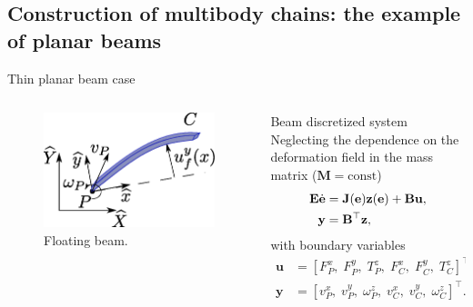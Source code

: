 \documentclass[aspectratio=169]{ISAE-Beamer}
\begin{document}
\subsection{Construction of multibody chains: the example of planar beams}

\begin{frame}{Thin planar beam case}
\begin{columns}[T]
	\begin{column}{0.5\columnwidth}
		\begin{tcolorbox}
			\begin{figure}
				\centering
				\includegraphics[width=0.98\columnwidth]{part_4/pHfmd/beam.eps} 
				\caption{Floating beam.}
				\label{fig:beam}
			\end{figure}
		\end{tcolorbox}
	\end{column}
	\begin{column}{0.5\textwidth}
		\begin{block}{Beam discretized system}
			Neglecting the dependence on the deformation field in the mass matrix ($\mathbf{M}=\text{const}$)
			\begin{equation*}
			\begin{aligned}
			\mathbf{E} \dot{\mathbf{e}} &= \mathbf{J}(\mathbf{e}) \mathbf{z}(\mathbf{e}) + \mathbf{B} \mathbf{u}, \vspace{2mm} \\
			\mathbf{y} &= \mathbf{B}^{\top}  \mathbf{z}, \\
			\end{aligned}
			\end{equation*}
			with boundary variables
			\begin{equation*}
			\begin{aligned}
			\mathbf{u} &=  [F_{P}^x, \; F_{P}^y, \; T_{P}^z, \; F_{C}^x, \; F_{C}^y, \; T_{C}^z]^\top, \\
			\mathbf{y} &=  [v_{P}^x, \; v_{P}^y, \; \omega_{P}^z, \; v_{C}^x, \; v_{C}^y, \; \omega_{C}^z]^\top.
			\end{aligned}
			\end{equation*}
		\end{block}	
	\end{column}
\end{columns}

\end{frame}
\end{document}
